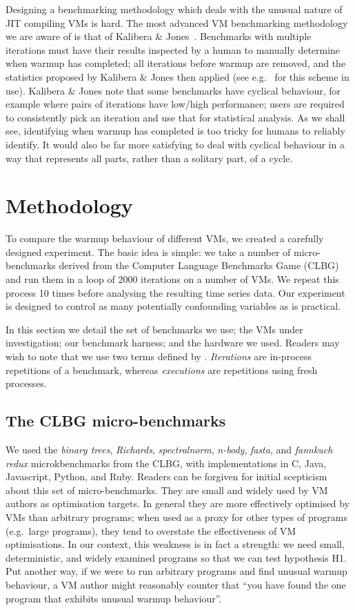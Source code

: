 \documentclass[10pt,preprint]{sigplanconf}
\newcommand{\kalibera}{Kalibera \& Jones\xspace}
\newcommand{\hypone}{H1\xspace}
\newcommand{\binarytrees}{\emph{binary trees}\xspace}
\newcommand{\richards}{\emph{Richards}\xspace}
\newcommand{\spectralnorm}{\emph{spectralnorm}\xspace}
\newcommand{\nbody}{\emph{n-body}\xspace}
\newcommand{\fasta}{\emph{fasta}\xspace}
\newcommand{\fannkuch}{\emph{fannkuch redux}\xspace}
\begin{document}
Designing a benchmarking methodology which deals with the unusual nature of JIT
compiling VMs is hard. The most advanced VM benchmarking methodology we are
aware of is that of \kalibera~\cite{kalibera12quantifying,kalibera13rigorous}.
Benchmarks with multiple iterations must have their results inspected by a human
to manually determine when warmup has completed; all iterations before warmup
are removed, and the statistics proposed by \kalibera then applied (see
e.g.~\cite{barrett15approaches,grimmer15dynamically} for this scheme in use).
\kalibera note that some benchmarks have cyclical behaviour, for example where
pairs of iterations have low/high performance; users are required to
consistently pick an iteration and use that for statistical analysis. As we
shall see, identifying when warmup has completed is too tricky for humans to
reliably identify. It would also be far more satisfying to deal with cyclical
behaviour in a way that represents all parts, rather than a solitary part, of a
cycle.


\section{Methodology}
\label{sec:methodology}

To compare the warmup behaviour of different VMs, we created a carefully
designed experiment. The basic idea is simple: we take a number of
micro-benchmarks derived from the Computer Language Benchmarks Game (CLBG) and
run them in a loop of 2000 iterations on a number of VMs. We repeat this
process 10 times before analysing the resulting time series data. Our
experiment is designed to control as many potentially confounding variables as
is practical.

In this section we detail the set of benchmarks we use; the VMs under
investigation; our benchmark harness;
and the hardware we used. Readers may wish to note that we use two terms defined
by \cite{kalibera13rigorous}. \emph{Iterations} are in-process repetitions of a
benchmark, whereas \emph{executions} are repetitions using fresh processes.


\subsection{The CLBG micro-benchmarks}

We used the \binarytrees, \richards, \spectralnorm, \nbody, \fasta, and
\fannkuch microkbenchmarks from the CLBG, with implementations in C, Java,
Javascript, Python, and Ruby. Readers can be forgiven for initial scepticism
about this set of micro-benchmarks. They are small and widely
used by VM authors as optimisation targets. In general they are more effectively
optimised by VMs than arbitrary programs; when used as a proxy for other types
of programs (e.g.~large programs), they tend to overstate the effectiveness of
VM optimisations. In our context, this weakness is in fact a strength: we need
small, deterministic, and widely examined programs so that we can test
hypothesis \hypone. Put another way, if we were to run arbitrary programs
and find unusual warmup behaviour, a VM author might reasonably counter that
``you have found the one program that exhibits unusual warmup behaviour''.
\end{document}
